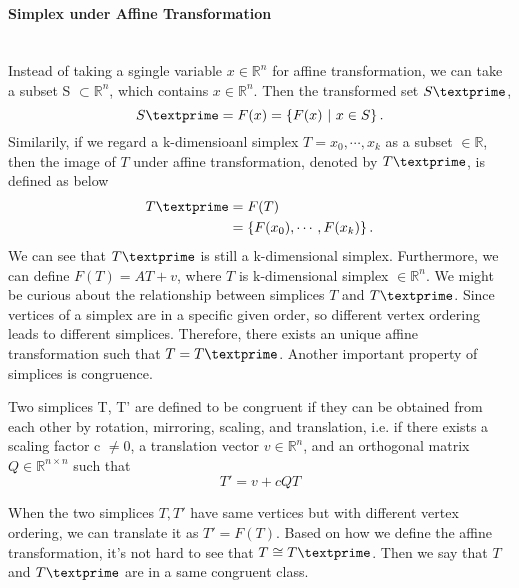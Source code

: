     \paragraph{Simplex under Affine Transformation}\mbox{}\\
    Instead of taking a sgingle variable $x\in\mathbb{R}^n$ for affine transformation, we can take a subset S $\subset \mathbb{R}^n$, which contains $x\in\mathbb{R}^n$. Then the transformed set $S\textprime$,
    \begin{equation*}
    S\textprime= {F}(x) = \left\{{F}(x) ~|~ x\in S \right\}.
    \end{equation*}
    Similarily, if we regard a k-dimensioanl simplex ${T} = {x_0, \cdots, x_k}$ as a subset $\in\mathbb{R}$, then the image of ${T}$ under affine transformation, denoted by $T\textprime$, is defined as below
    \begin{equation*}
    \begin{split}
    {T}\textprime & = {F}({T})\\
    & = \left\{{F}(x_0), \cdots , {F}(x_k)\right\}.
    \end{split}
    \end{equation*}
    We can see that ${T}\textprime$ is still a k-dimensional simplex. Furthermore, we can define ${F}({T}) = {AT} + {v}$, where $T$ is k-dimensional simplex $\in\mathbb{R}^n$. We might be curious about the relationship between simplices ${T}$ and ${T}\textprime$. Since vertices of a simplex are in a specific given order, so different vertex ordering leads to different simplices. Therefore, there exists an unique affine transformation such that ${T} = {T}\textprime$. Another important property of simplices is congruence.

    \begin{definition*}
    Two simplices T, T' are defined to be congruent if they can be obtained from each other by rotation, mirroring, scaling, and translation, i.e. if there exists a scaling factor c $\neq 0$, a translation vector $v\in\mathbb{R}^n$, and an orthogonal matrix $Q\in\mathbb{R}^{n\times n}$ such that
    \begin{equation*}
    T' = v + cQT
    \end{equation*}
    \end{definition*}
    \noindent
    When the two simplices $T, T'$ have same vertices but with different vertex ordering, we can translate it as $T' = F(T)$. Based on how we define the affine transformation, it's not hard to see that ${T} \cong {T}\textprime$. Then we say that ${T}$ and ${T}\textprime$ are in a same congruent class.